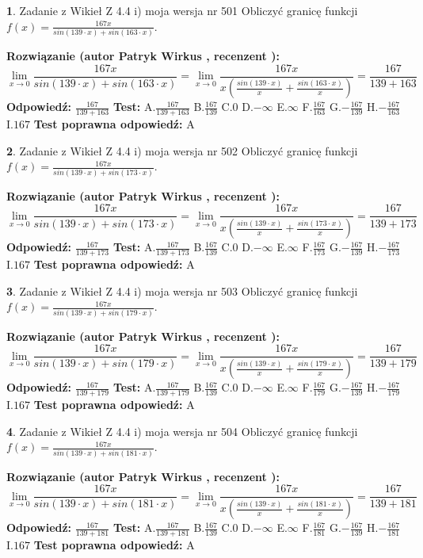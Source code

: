 \documentclass[12pt, a4paper]{article}
\theoremstyle{definition} %
\newtheorem{zad}{}
\newcommand{\zadStart}[1]{\begin{zad}#1\newline}
\newcommand{\zadStop}{\end{zad}}
\newcommand{\rozwStart}[2]{\noindent \textbf{Rozwiązanie (autor #1 , recenzent #2): }\newline}
\newcommand{\rozwStop}{\newline}
\newcommand{\odpStart}{\noindent \textbf{Odpowiedź:}\newline}
\newcommand{\odpStop}{\newline}
\newcommand{\testStart}{\noindent \textbf{Test:}\newline}
\newcommand{\testStop}{\newline}
\newcommand{\kluczStart}{\noindent \textbf{Test poprawna odpowiedź:}\newline}
\newcommand{\kluczStop}{\newline}
\begin{document}
\zadStart{Zadanie z Wikieł Z 4.4 i) moja wersja nr 501}
Obliczyć granicę funkcji $f(x)=\frac{167x}{sin(139\cdot x) +sin(163\cdot x)}$.
\zadStop
\rozwStart{Patryk Wirkus}{}
$$\lim\limits_{x\to 0}\frac{167x}{sin(139\cdot x) +sin(163\cdot x)}=\lim\limits_{x\to 0}\frac{167x}{x(\frac{sin(139\cdot x)}{x}+\frac{sin(163\cdot x)}{x})}=\frac{167}{139+163}$$
\rozwStop
\odpStart
$\frac{167}{139+163}$
\odpStop
\testStart
A.$\frac{167}{139+163}$
B.$\frac{167}{139}$
C.$0$
D.$-\infty$
E.$\infty$
F.$\frac{167}{163}$
G.$-\frac{167}{139}$
H.$-\frac{167}{163}$
I.$167$
\testStop
\kluczStart
A
\kluczStop



\zadStart{Zadanie z Wikieł Z 4.4 i) moja wersja nr 502}
Obliczyć granicę funkcji $f(x)=\frac{167x}{sin(139\cdot x) +sin(173\cdot x)}$.
\zadStop
\rozwStart{Patryk Wirkus}{}
$$\lim\limits_{x\to 0}\frac{167x}{sin(139\cdot x) +sin(173\cdot x)}=\lim\limits_{x\to 0}\frac{167x}{x(\frac{sin(139\cdot x)}{x}+\frac{sin(173\cdot x)}{x})}=\frac{167}{139+173}$$
\rozwStop
\odpStart
$\frac{167}{139+173}$
\odpStop
\testStart
A.$\frac{167}{139+173}$
B.$\frac{167}{139}$
C.$0$
D.$-\infty$
E.$\infty$
F.$\frac{167}{173}$
G.$-\frac{167}{139}$
H.$-\frac{167}{173}$
I.$167$
\testStop
\kluczStart
A
\kluczStop



\zadStart{Zadanie z Wikieł Z 4.4 i) moja wersja nr 503}
Obliczyć granicę funkcji $f(x)=\frac{167x}{sin(139\cdot x) +sin(179\cdot x)}$.
\zadStop
\rozwStart{Patryk Wirkus}{}
$$\lim\limits_{x\to 0}\frac{167x}{sin(139\cdot x) +sin(179\cdot x)}=\lim\limits_{x\to 0}\frac{167x}{x(\frac{sin(139\cdot x)}{x}+\frac{sin(179\cdot x)}{x})}=\frac{167}{139+179}$$
\rozwStop
\odpStart
$\frac{167}{139+179}$
\odpStop
\testStart
A.$\frac{167}{139+179}$
B.$\frac{167}{139}$
C.$0$
D.$-\infty$
E.$\infty$
F.$\frac{167}{179}$
G.$-\frac{167}{139}$
H.$-\frac{167}{179}$
I.$167$
\testStop
\kluczStart
A
\kluczStop



\zadStart{Zadanie z Wikieł Z 4.4 i) moja wersja nr 504}
Obliczyć granicę funkcji $f(x)=\frac{167x}{sin(139\cdot x) +sin(181\cdot x)}$.
\zadStop
\rozwStart{Patryk Wirkus}{}
$$\lim\limits_{x\to 0}\frac{167x}{sin(139\cdot x) +sin(181\cdot x)}=\lim\limits_{x\to 0}\frac{167x}{x(\frac{sin(139\cdot x)}{x}+\frac{sin(181\cdot x)}{x})}=\frac{167}{139+181}$$
\rozwStop
\odpStart
$\frac{167}{139+181}$
\odpStop
\testStart
A.$\frac{167}{139+181}$
B.$\frac{167}{139}$
C.$0$
D.$-\infty$
E.$\infty$
F.$\frac{167}{181}$
G.$-\frac{167}{139}$
H.$-\frac{167}{181}$
I.$167$
\testStop
\kluczStart
A
\kluczStop
\end{document}
